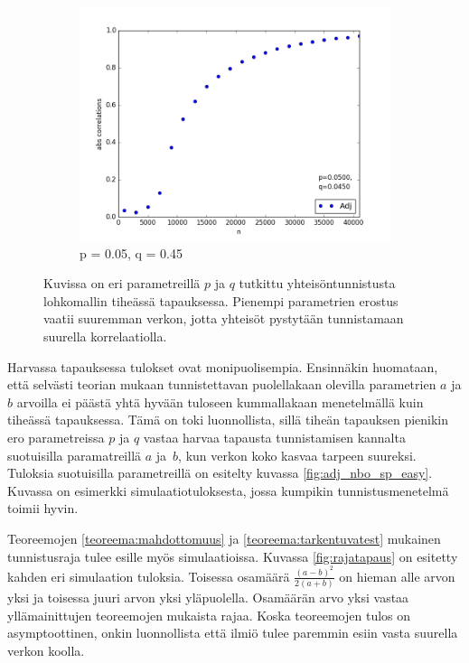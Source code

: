 \documentclass[finnish,12pt,a4paper,pdftex,sci,utf8]{aaltothesis}
\begin{document}
\begin{figure}
\begin{subfigure}{0.3\textwidth}
		\includegraphics[width=\textwidth]{o_pres_3.png}
		\caption{p = 0.05, q = 0.45}
	\end{subfigure}
	\caption{Kuvissa on eri parametreillä $p$ ja $q$ tutkittu yhteisöntunnistusta lohkomallin tiheässä tapauksessa. Pienempi parametrien erostus vaatii suuremman verkon, jotta yhteisöt pystytään tunnistamaan suurella korrelaatiolla.}
	\label{fig:o_adj_all}
\end{figure}
Harvassa tapauksessa tulokset ovat monipuolisempia. Ensinnäkin huomataan, että selvästi teorian mukaan tunnistettavan puolellakaan olevilla parametrien $a$ ja $b$ arvoilla ei päästä yhtä hyvään tuloseen kummallakaan menetelmällä kuin tiheässä tapauksessa. Tämä on toki luonnollista, sillä tiheän tapauksen pienikin ero parametreissa $p$ ja $q$ vastaa harvaa tapausta tunnistamisen kannalta suotuisilla paramatreillä $a$ ja $b$, kun verkon koko kasvaa tarpeen suureksi. Tuloksia suotuisilla parametreillä on esitelty kuvassa \ref{fig:adj_nbo_sp_easy}. Kuvassa on esimerkki simulaatiotuloksesta, jossa kumpikin tunnistusmenetelmä toimii hyvin.

Teoreemojen \ref{teoreema:mahdottomuus} ja \ref{teoreema:tarkentuvatest} mukainen tunnistusraja tulee esille myös simulaatioissa. Kuvassa \ref{fig:rajatapaus} on esitetty kahden eri simulaation tuloksia. Toisessa osamäärä $\frac{(a-b)^2}{2(a+b)}$ on hieman alle arvon yksi ja toisessa juuri arvon yksi yläpuolella. Osamäärän arvo yksi vastaa yllämainittujen teoreemojen mukaista rajaa. Koska teoreemojen tulos on asymptoottinen, onkin luonnollista että ilmiö tulee paremmin esiin vasta suurella verkon koolla.
\end{document}
